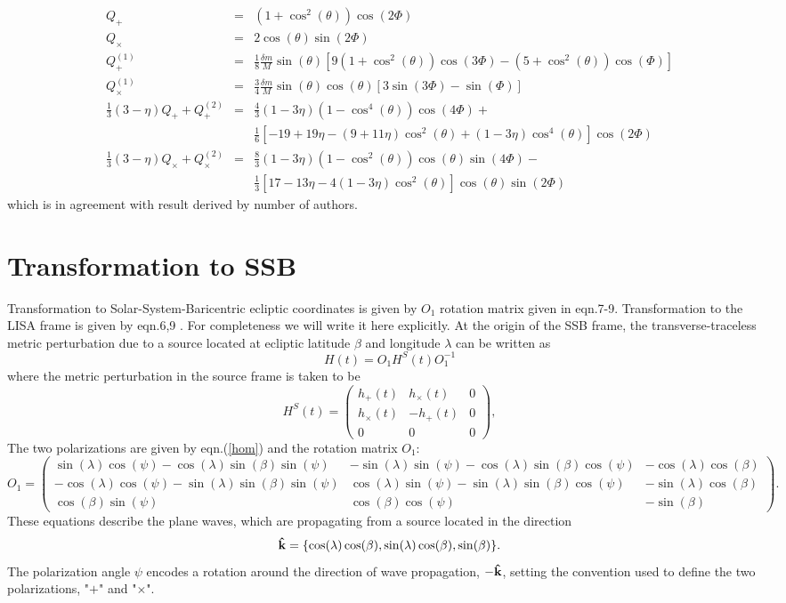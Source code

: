 \documentclass[11pt]{report}
\def\be{\begin{equation}}
\def\bea{\begin{eqnarray}}
\def\en{\end{equation}}
\def\ena{\end{eqnarray}}
\begin{document}
\bea
Q_{+} &=& (1+\cos^2(\theta))\cos(2\Phi)\\
Q_{\times} &=& 2\cos(\theta)\sin(2\Phi)\\
Q^{(1)}_{+} &=& \frac1{8}\frac{\delta m}{M}\sin(\theta)
\left[ 9(1+\cos^2(\theta))\cos(3\Phi) - (5+\cos^2(\theta))\cos(\Phi) \right]\\
Q^{(1)}_{\times} &=& \frac3{4} \frac{\delta m}{M}\sin(\theta)
\cos(\theta)\left[ 3\sin(3\Phi) - \sin(\Phi) \right]\\
\frac1{3}(3-\eta)Q_{+} + Q^{(2)}_{+} &=& \frac4{3} (1-3\eta)
(1-\cos^4(\theta))\cos(4\Phi) + \nonumber \\
& &\frac1{6}\left[ -19 + 19\eta -(9 + 11\eta)\cos^2(\theta) + (1-3\eta)\cos^4(\theta)\right] \cos(2\Phi)\\
\frac1{3}(3-\eta)Q_{\times} + Q^{(2)}_{\times} &=&
\frac8{3}(1-3\eta)(1-\cos^2(\theta))\cos(\theta)\sin(4\Phi) - 
\nonumber \\
& &\frac1{3}\left[ 17  -13\eta -4(1-3\eta)\cos^2(\theta)
 \right]\cos(\theta)\sin(2\Phi)
\ena
which is in agreement with result derived by number of authors.




\section{Transformation to SSB}
\label{SSB}

Transformation to Solar-System-Baricentric ecliptic coordinates 
is given by $O_1$ rotation matrix given in \cite{KTV} eqn.7-9.
Transformation to the LISA frame is given by eqn.6,9 \cite{KTV}.
For completeness we will write it here explicitly. 
At the origin of the SSB frame, the transverse-traceless metric perturbation due 
to a source located at ecliptic latitude $\beta$ and longitude $\lambda$ can be written as
\be
H(t) = O_1 H^S(t)O_1^{-1}
\en
where the metric perturbation in the source frame is taken to be
\be
H^S(t) = \left( \begin{array}{ccc}
h_{+}(t) & h_{\times}(t) & 0 \\
h_{\times}(t) & -h_{+}(t) & 0 \\
0 & 0 & 0 \end{array} \right),
\en
The two polarizations are given by eqn.(\ref{hom}) and the rotation matrix
$O_1$:
\be
O_1 =\left( \begin{array}{ccc}
\sin(\lambda)\cos(\psi) - \cos(\lambda)\sin(\beta)\sin(\psi) &  
-\sin(\lambda)\sin(\psi) - \cos(\lambda)\sin(\beta)\cos(\psi) & 
-\cos(\lambda)\cos(\beta) \\  
-\cos(\lambda)\cos(\psi)  - \sin(\lambda)\sin(\beta)\sin(\psi) &
\cos(\lambda)\sin(\psi) - \sin(\lambda)\sin(\beta)\cos(\psi) &
 -\sin(\lambda)\cos(\beta) \\  
\cos(\beta)\sin(\psi) &  \cos(\beta)\cos(\psi) & -\sin(\beta)  
 \end{array} 
\right).
\en 
These equations describe the plane waves, which are
propagating from a source located in the direction
\be
{\bf \hat{k}} = \{ \cos(\lambda)\cos(\beta), \sin(\lambda)\cos(\beta), 
\sin(\beta)\}.
\en
The polarization angle $\psi$ encodes a rotation around the direction of wave propagation, $-{\bf \hat{k}}$, setting the convention used to define the two polarizations, "$+$" and "$\times$".
\end{document}
